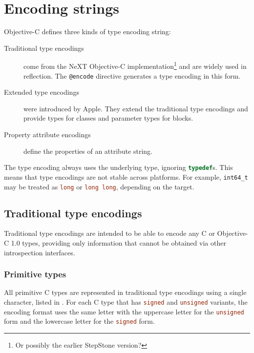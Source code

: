 \documentclass[a4paper]{report}
\newcommand{\ccode}[1]{\lstinline[language={C}]{#1}}
\newcommand{\objc}[1]{\lstinline[language={[Objective]C}]{#1}}
\begin{document}
\chapter{Encoding strings}

Objective-C defines three kinds of type encoding string:

\begin{description}
	\item[Traditional type encodings] come from the NeXT Objective-C implementation\footnote{Or possibly the earlier StepStone version?} and are widely used in reflection.  The \objc{@encode} directive generates a type encoding in this form.
	\item[Extended type encodings] were introduced by Apple.  They extend the traditional type encodings and provide types for classes and parameter types for blocks.
	\item[Property attribute encodings] define the properties of an attribute string.
\end{description}

The type encoding always uses the underlying type, ignoring \ccode{typedef}s.
This means that type encodings are not stable across platforms.
For example, \ccode{int64_t} may be treated as \ccode{long} or \ccode{long long}, depending on the target.

\section{Traditional type encodings}

Traditional type encodings are intended to be able to encode any C or Objective-C 1.0 types, providing only information that cannot be obtained via other introspection interfaces.

\subsection{Primitive types}

All primitive C types are represented in traditional type encodings using a single character, listed in .
For each C type that has \ccode{signed} and \ccode{unsigned} variants, the encoding format uses the same letter with the uppercase letter for the \ccode{unsigned} form and the lowercase letter for the \ccode{signed} form.
\end{document}
